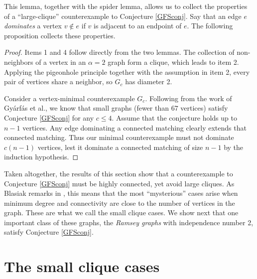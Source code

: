 This lemma, together with the spider lemma, allows us to collect the properties of a ``large-clique'' counterexample to Conjecture \ref{GFSconj}.  Say that an edge $e$ {\it dominates} a vertex $v \notin e$ if $v$ is adjacent to an endpoint of $e$.  The following proposition collects these properties.
  
\begin{proof}
Items 1 and 4 follow directly from the two lemmas.  The collection of non-neighbors of a vertex in an $\alpha = 2$ graph form a clique, which leads to item 2.  Applying the pigeonhole principle together with the assumption in  item 2, every pair of vertices share a neighbor, so $G_c$ has diameter 2. 

Consider a vertex-minimal counterexample $G_c$.  Following from the work of Gy\'arf\'as et al., we know that small graphs (fewer than $67$ vertices) satisfy Conjecture \ref{GFSconj} for any $c \leq 4$.  Assume that the conjecture holds up to $n-1$ vertices.  Any edge dominating a connected matching clearly extends that connected matching.  Thus our minimal counterexample must not dominate $c(n-1)$ vertices, lest it dominate a connected matching of size $n-1$ by the induction hypothesis.
\end{proof}   

Taken altogether, the results of this section show that a counterexample to Conjecture \ref{GFSconj} must be highly connected, yet avoid large cliques.  As Blasiak remarks in \cite{Blas}, this means that the most ``mysterious'' cases arise when minimum degree and connectivity are close to the number of vertices in the graph.  These are what we call the small clique cases.  We show next that one important class of these graphs, the {\it Ramsey graphs} with independence number 2, satisfy Conjecture \ref{GFSconj}.  

\section{The small clique cases}


